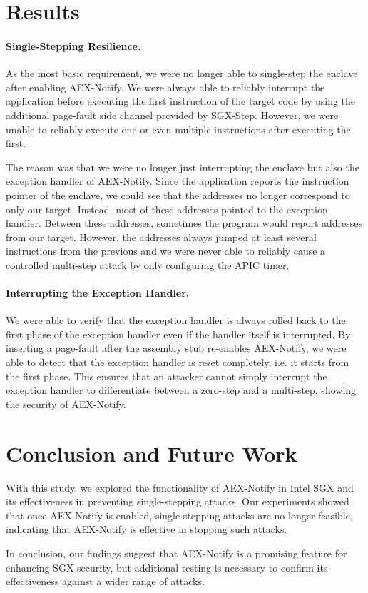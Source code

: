 \documentclass{llncs}
\begin{document}
\section{Results}

\paragraph{Single-Stepping Resilience.}
As the most basic requirement,
we were no longer able to single-step the enclave after enabling AEX-Notify.
We were always able to reliably interrupt the application
before executing the first instruction of the target code
by using the additional page-fault side channel provided by SGX-Step.
However, we were unable to reliably execute one or
even multiple instructions after executing the first.

The reason was that we were no longer just interrupting the enclave but also the exception handler of AEX-Notify.
Since the application reports the instruction pointer of the enclave,
we could see that the addresses no longer correspond to only our target.
Instead, most of these addresses pointed to the exception handler.
Between these addresses, sometimes the program would report addresses from our target.
However, the addresses always jumped at least several instructions from the previous
and we were never able to reliably cause a controlled multi-step attack
by only configuring the APIC timer.


\paragraph{Interrupting the Exception Handler.}
We were able to verify that the exception handler is always rolled back to the first phase of the exception handler
even if the handler itself is interrupted.
By inserting a page-fault after the assembly stub re-enables AEX-Notify,
we were able to detect that the exception handler is reset completely,
i.e. it starts from the first phase.
This ensures that an attacker cannot simply interrupt the exception handler
to differentiate between a zero-step and a multi-step,
showing the security of AEX-Notify.

\section{Conclusion and Future Work}

With this study, we explored the functionality of AEX-Notify in Intel SGX and
its effectiveness in preventing single-stepping attacks.
Our experiments showed that once AEX-Notify is enabled,
single-stepping attacks are no longer feasible,
indicating that AEX-Notify is effective in stopping such attacks.

In conclusion, our findings suggest that AEX-Notify is a promising feature for enhancing SGX security,
but additional testing is necessary to confirm its effectiveness against a wider range of attacks.


%

\end{document}
